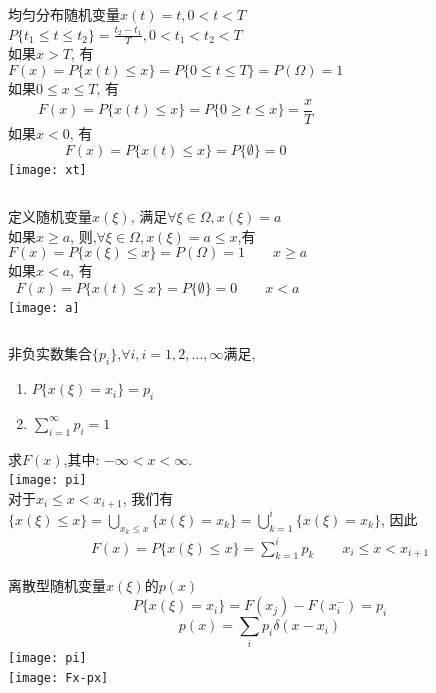 \begin{frame}
\begin{columns}
	均匀分布随机变量$x(t)=t,0<t<T$\\
	$P\{t_1\le t\le t_2\}=\frac{t_2-t_1}{T},0<t_1<t_2<T$\\
	如果$x> T$, 有
	\[F(x)=P\{x(t)\le x \}=P\{0\le t\le T \}=P(\Omega)= 1 \] 
	如果$0\le x\le T$, 有
	\[F(x)=P\{x(t)\le x \}=P\{0\ge t\le x\}=\frac{x}{T}  \] 
	如果$x<0$, 有
	\[F(x)=P\{x(t)\le x \}=P\{\emptyset\}=0 \] 
	\texttt{[image: xt]}
\end{columns}
\end{frame}

\begin{frame}
\begin{columns}
	定义随机变量$x(\xi)$, 满足$\forall \xi\in\Omega, x(\xi)=a$\\
	如果$x\ge a$, 则,$\forall \xi\in\Omega, x(\xi)=a\le x$,有
	\[F(x)=P\{x(\xi)\le x \}=P(\Omega)= 1\qquad x\ge a \] 
	如果$x<a$, 有
	\[F(x)=P\{x(t)\le x \}=P\{\emptyset\}=0 \qquad x<a \] 
	\texttt{[image: a]}
\end{columns}
\end{frame}

\begin{frame}[shrink]
非负实数集合$\{p_i\}$,$\forall i, i=1,2,\dots,\infty$满足, 
\begin{enumerate}
	\item $P\{x(\xi)=x_i\}=p_i$
	\item $\sum\limits_{i=1}^{\infty}p_i=1$
\end{enumerate}
求$F(x)$,其中: $-\infty<x<\infty$.\\
\texttt{[image: pi]}\\
对于$x_i\le x<x_{i+1}$, 我们有$\{x(\xi)\le x \}=\bigcup\limits_{x_k\le x}\{x(\xi)=x_k\}=\bigcup\limits_{k=1}^{i}\{x(\xi)=x_k\}$, 因此
\begin{align*}
F(x)=P\{x(\xi)\le x\}=\sum\limits_{k=1}^{i}p_k \qquad x_i\le x<x_{i+1}
\end{align*}
\end{frame}

\begin{frame}{离散型随机变量$x(\xi)$的$p(x)$}
\[P\{x(\xi)=x_i\}=F(x_j)-F(x_i^{-})=p_i\]
\[p(x)=\sum\limits_{i}p_i\delta(x-x_i) \]
\texttt{[image: pi]}\\
\texttt{[image: Fx-px]}
\end{frame}



